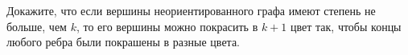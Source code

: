 Докажите, что если вершины неориентированного графа имеют степень не больше, чем $k$, то его вершины можно покрасить в $k +
1$ цвет так, чтобы концы любого ребра были покрашены в разные цвета.
